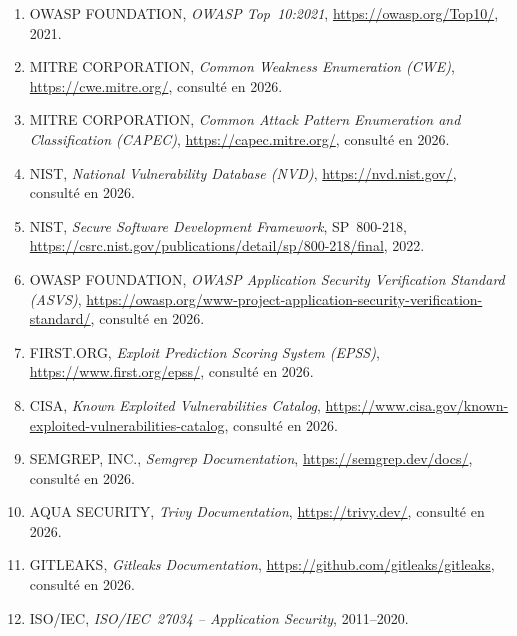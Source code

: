 \documentclass[12pt,a4paper,oneside]{report}
\begin{document}
\begin{enumerate}[leftmargin=1.8em, itemsep=0.4em]
\item OWASP FOUNDATION, \textit{OWASP Top~10:2021}, \url{https://owasp.org/Top10/}, 2021.
\item MITRE CORPORATION, \textit{Common Weakness Enumeration (CWE)}, \url{https://cwe.mitre.org/}, consult\'e en 2026.
\item MITRE CORPORATION, \textit{Common Attack Pattern Enumeration and Classification (CAPEC)}, \url{https://capec.mitre.org/}, consult\'e en 2026.
\item NIST, \textit{National Vulnerability Database (NVD)}, \url{https://nvd.nist.gov/}, consult\'e en 2026.
\item NIST, \textit{Secure Software Development Framework}, SP~800-218, \url{https://csrc.nist.gov/publications/detail/sp/800-218/final}, 2022.
\item OWASP FOUNDATION, \textit{OWASP Application Security Verification Standard (ASVS)}, \url{https://owasp.org/www-project-application-security-verification-standard/}, consult\'e en 2026.
\item FIRST.ORG, \textit{Exploit Prediction Scoring System (EPSS)}, \url{https://www.first.org/epss/}, consult\'e en 2026.
\item CISA, \textit{Known Exploited Vulnerabilities Catalog}, \url{https://www.cisa.gov/known-exploited-vulnerabilities-catalog}, consult\'e en 2026.
\item SEMGREP, INC., \textit{Semgrep Documentation}, \url{https://semgrep.dev/docs/}, consult\'e en 2026.
\item AQUA SECURITY, \textit{Trivy Documentation}, \url{https://trivy.dev/}, consult\'e en 2026.
\item GITLEAKS, \textit{Gitleaks Documentation}, \url{https://github.com/gitleaks/gitleaks}, consult\'e en 2026.
\item ISO/IEC, \textit{ISO/IEC~27034 -- Application Security}, 2011--2020.
\end{enumerate}


\end{document}
